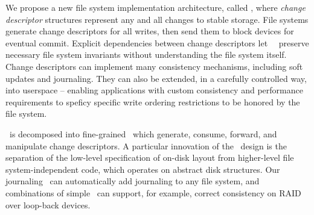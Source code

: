 
We propose a new file system implementation architecture, called \emph{\Kudos},
where \emph{change descriptor} structures represent any and all changes to
stable storage. File systems generate change descriptors for all writes, then
send them to block devices for eventual commit. Explicit dependencies between
change descriptors let \Kudos\ \modules\ preserve necessary file system
invariants without understanding the file system itself. Change descriptors can
implement many consistency mechanisms, including soft updates and journaling.
They can also be extended, in a carefully controlled way, into userspace --
enabling applications with custom consistency and performance requirements to
speficy specific write ordering restrictions to be honored by the file system.

\Kudos\ is decomposed into fine-grained \modules\ which generate, consume,
forward, and manipulate change descriptors. A particular innovation of the
\module\ design is the separation of the low-level specification of on-disk
layout from higher-level file system-independent code, which operates on
abstract disk structures. Our journaling \module\ can automatically add
journaling to any file system, and combinations of simple \modules\ can support,
for example, correct consistency on RAID over loop-back devices.
